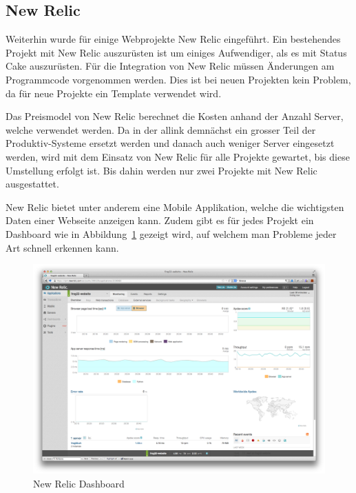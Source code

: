 \subsection{New Relic}
\label{sub:new_relic}
Weiterhin wurde für einige Webprojekte New Relic eingeführt. Ein bestehendes Projekt mit New Relic auszurüsten ist um einiges Aufwendiger, als es mit Status Cake auszurüsten. Für die Integration von New Relic müssen Änderungen am Programmcode vorgenommen werden. Dies ist bei neuen Projekten kein Problem, da für neue Projekte ein Template verwendet wird.

Das Preismodel von New Relic berechnet die Kosten anhand der Anzahl Server, welche verwendet werden. Da in der allink demnächst ein grosser Teil der Produktiv-Systeme ersetzt werden und danach auch weniger Server eingesetzt werden, wird mit dem Einsatz von New Relic für alle Projekte gewartet, bis diese Umstellung erfolgt ist. Bis dahin werden nur zwei Projekte mit New Relic ausgestattet.

New Relic bietet unter anderem eine Mobile Applikation, welche die wichtigsten Daten einer Webseite anzeigen kann. Zudem gibt es für jedes Projekt ein Dashboard wie in Abbildung~\ref{fig:new_relic_dashboard} gezeigt wird, auf welchem man Probleme jeder Art schnell erkennen kann.

\begin{figure}[ht]
\centering
\includegraphics[width=1\textwidth]{images/new_relic.png}
\caption{New Relic Dashboard}
\label{fig:new_relic_dashboard}
\end{figure}


